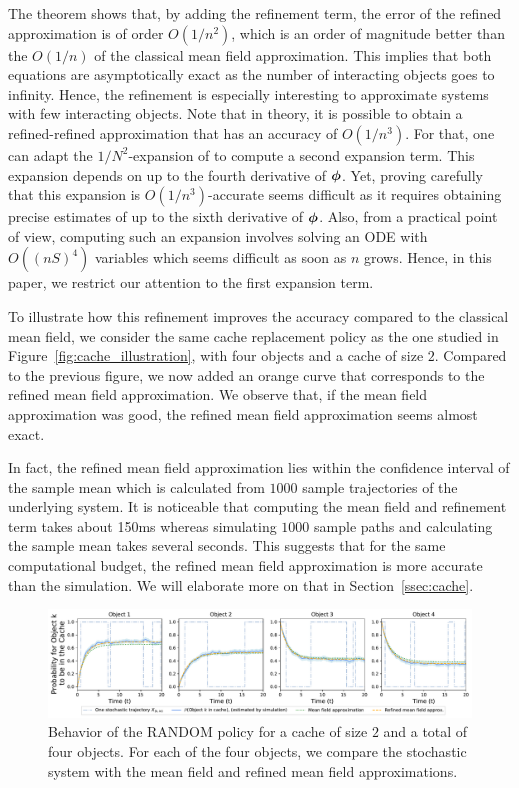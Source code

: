 \documentclass[acmsmall]{acmart}
\newcommand\bphi{\text{\boldmath$\phi$}}
\begin{document}
The theorem shows that, by adding the refinement term, the error of the refined approximation is of order $O(1/n^2)$, which is an order of magnitude better than the $O(1/n)$ of the classical mean field approximation. This implies that both equations are asymptotically exact as the number of interacting objects goes to infinity. Hence, the refinement is especially interesting to approximate systems with few interacting objects. Note that in theory, it is possible to obtain a refined-refined approximation that has an accuracy of $O(1/n^3)$. For that, one can adapt the $1/N^2$-expansion of \cite{gastSizeExpansionsMean2019} to compute a second expansion term. This expansion depends on up to the fourth derivative of $\bphi$. Yet, proving carefully that this expansion is $O(1/n^3)$-accurate seems difficult as it requires obtaining precise estimates of up to the sixth derivative of $\bphi$. Also, from a practical point of view, computing such an expansion involves solving an ODE with $O((nS)^4)$ variables which seems difficult as soon as $n$ grows. Hence, in this paper, we restrict our attention to the first expansion term.

To illustrate how this refinement improves the accuracy compared to the classical mean field, we consider the same cache replacement policy as the one studied in Figure~\ref{fig:cache_illustration}, with four objects and a cache of size $2$. Compared to the previous figure, we now added an orange curve that corresponds to the refined mean field approximation. We observe that, if the mean field approximation was good, the refined mean field approximation seems almost exact. 

In fact, the refined mean field approximation lies within the confidence interval of the sample mean which is calculated from $1000$ sample trajectories of the underlying system. It is noticeable that computing the mean field and refinement term takes about 150ms whereas simulating $1000$ sample paths and calculating the sample mean takes several seconds. 
This suggests that for the same computational budget, the refined mean field approximation is more accurate than the simulation. We will elaborate more on that in Section~\ref{ssec:cache}. 

\begin{figure}[ht]
  \centering
  \includegraphics[width=\linewidth]{probability_cache_single_rmf}
  \caption{Behavior of the RANDOM policy for a cache of size $2$ and a total of four objects. For each of the four objects, we compare the stochastic system with the mean field and refined mean field approximations. }
  \label{fig:cache_illustration_rmf}
\end{figure}
\end{document}

